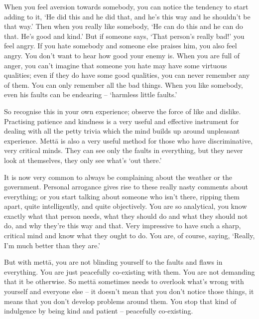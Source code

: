 When you feel aversion towards somebody, you can notice the tendency to start adding to it, `He did this and he did that, and he's this way and he shouldn't be that way.' Then when you really like somebody, `He can do this and he can do that. He's good and kind.' But if someone says, `That person's really bad!' you feel angry. If you hate somebody and someone else praises him, you also feel angry. You don't want to hear how good your enemy is. When you are full of anger, you can't imagine that someone you hate may have some virtuous qualities; even if they do have some good qualities, you can never remember any of them. You can only remember all the bad things. When you like somebody, even his faults can be endearing -- `harmless little faults.'

So recognise this in your own experience; observe the force of like and dislike. Practising patience and kindness is a very useful and effective instrument for dealing with all the petty trivia which the mind builds up around unpleasant experience. Mettā is also a very useful method for those who have discriminative, very critical minds. They can see only the faults in everything, but they never look at themselves, they only see what's `out there.'

It is now very common to always be complaining about the weather or the government. Personal arrogance gives rise to these really nasty comments about everything; or you start talking about someone who isn't there, ripping them apart, quite intelligently, and quite objectively. You are so analytical, you know exactly what that person needs, what they should do and what they should not do, and why they're this way and that. Very impressive to have such a sharp, critical mind and know what they ought to do. You are, of course, saying, `Really, I'm much better than they are.'

But with mettā, you are not blinding yourself to the faults and flaws in everything. You are just peacefully co-existing with them. You are not demanding that it be otherwise. So mettā sometimes needs to overlook what's wrong with yourself and everyone else -- it doesn't mean that you don't notice those things, it means that you don't develop problems around them. You stop that kind of indulgence by being kind and patient -- peacefully co-existing.

